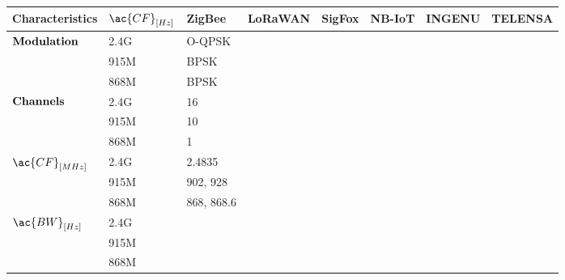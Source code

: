 \begin{longtable}{l|l|l|l|l|l|l|l}
	\bf{Characteristics}               & $\ac{CF}_{[Hz]}$ & \bf{ZigBee}  & \bf{LoRaWAN} & \bf{SigFox} & \bf{NB-IoT} & \textbf{INGENU} & \textbf{TELENSA}\\\hline
	\multirow{3}{*}{$\bf{Modulation}$} & 2.4G             & O-QPSK       &              &             &             &                                   \\
	\                                  & 915M             & BPSK         &              &             &             &                 &                 \\
	\                                  & 868M             & BPSK         &              &             &             &                 &                 \\\hline
	\multirow{3}{*}{$\bf{Channels}$}   & 2.4G             & 16           &              &             &             &                 &                 \\
	\                                  & 915M             & 10           &              &             &             &                 &                 \\
	\                                  & 868M             & 1            &              &             &             &                 &                 \\\hline
	\multirow{2}{*}{$\ac{CF}_{[MHz]}$} & 2.4G             & 2.4835       &              &             &             &                 &                 \\
	\                                  & 915M             & 902, 928     &              &             &             &                 &                 \\
	\                                  & 868M             & 868, 868.6   &              &             &             &                 &                 \\\hline
	\multirow{3}{*}{$\ac{BW}_{[Hz]}$}  & 2.4G             &              &              &             &             &                 &                 \\
	\                                  & 915M             &              &              &             &             &                 &                 \\
	\                                  & 868M             &              &              &             &             &                 &                 \\\hline

\end{longtable}
